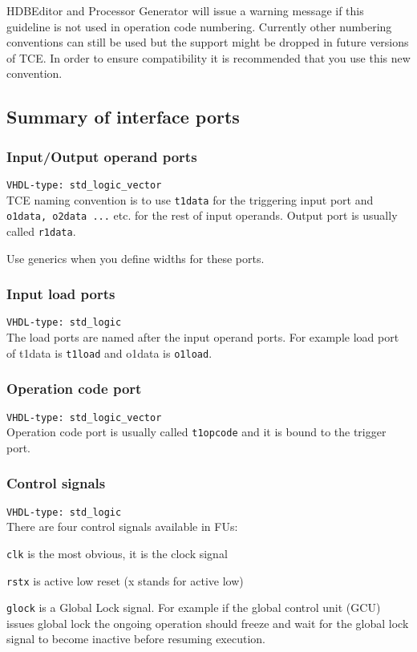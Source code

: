 \documentclass[twoside]{tceusermanual}
\begin{document}
HDBEditor and Processor Generator will issue a warning message if this
guideline is not used in operation code numbering. Currently other
numbering conventions can still be used but the support might be dropped
in future versions of TCE. In order to ensure compatibility it is recommended
that you use this new convention.


\subsection{Summary of interface ports}
\subsubsection{Input/Output operand ports}
\verb|VHDL-type: std_logic_vector| \\
TCE naming convention is to use \verb|t1data| for the triggering input port
and \verb|o1data, o2data ...| etc. for the rest of input operands. Output port
is usually called \verb|r1data|.

Use generics when you define widths for these ports.

\subsubsection{Input load ports}
\verb|VHDL-type: std_logic| \\
The load ports are named after the input operand ports. For example load port
of t1data is \verb|t1load| and o1data is \verb|o1load|.

\subsubsection{Operation code port}
\verb|VHDL-type: std_logic_vector| \\
Operation code port is usually called \verb|t1opcode| and it is bound to the
trigger port.

\subsubsection{Control signals}
\verb|VHDL-type: std_logic| \\
There are four control signals available in FUs:

\verb|clk| is the most obvious, it is the clock signal

\verb|rstx| is active low reset (x stands for active low)

\verb|glock| is a Global Lock signal. For example if the global control unit
(GCU) issues global lock the ongoing operation should freeze and wait for
the global lock signal to become inactive before resuming execution.
\end{document}
